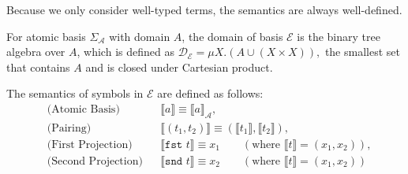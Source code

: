 \documentclass[manuscript, review, timestamp]{acmart}
\newcommand*{\fst}{\texttt{fst }}
\newcommand*{\snd}{\texttt{snd }}
\newcommand*{\sem}[1]{\llbracket #1 \rrbracket}
\begin{document}
Because we only consider well-typed terms, the semantics are always well-defined.


\begin{definition}
  For atomic basis $\Sigma_\mathcal{A}$ with domain $A$, the domain of basis $\mathcal{E}$ is the binary tree algebra over $A$, which is defined as 
  $
  \mathcal{D}_\mathcal{E} = \mu X.(A \cup (X \times X)),
  $
  the smallest set that contains $A$ and is closed under Cartesian product.

  The semantics of symbols in $\mathcal{E}$ are defined as follows:
  \begin{align*}
    & \text{(Atomic Basis)} && \sem{a} \equiv \sem{a}_\mathcal{A}, \\
    & \text{(Pairing)} &&
    \sem{(t_1, t_2)} \equiv (\sem{t_1}, \sem{t_2}), \\
    & \text{(First Projection)} &&
    \sem{\fst t} \equiv x_1 \qquad (\text{where } \sem{t} = (x_1, x_2)), \\
    & \text{(Second Projection)} &&
    \sem{\snd t} \equiv x_2 \qquad (\text{where } \sem{t} = (x_1, x_2))
  \end{align*}
\end{definition}


\end{document}
